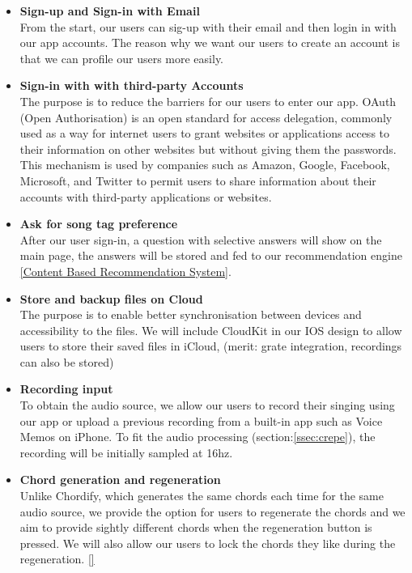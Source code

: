 \begin{itemize}

\item \textbf{Sign-up and Sign-in with Email}
\\From the start, our users can sig-up with their email and then login in with our app accounts. The reason why we want our users to create an account is that we can profile our users more easily.

\item \textbf{Sign-in with with third-party Accounts}
\\ The purpose is to reduce the barriers for our users to enter our app. OAuth (Open Authorisation) is an open standard for access delegation, commonly used as a way for internet users to grant websites or applications access to their information on other websites but without giving them the passwords. This mechanism is used by companies such as Amazon, Google, Facebook, Microsoft, and Twitter to permit users to share information about their accounts with third-party applications or websites.

\item \textbf{Ask for song tag preference}
\\After our user sign-in, a question with selective answers will show on the main page, the answers will be stored and fed to our recommendation engine \autoref{Content Based Recommendation System}.

\item \textbf{Store and backup files on Cloud}
\\The purpose is to enable better synchronisation between devices and accessibility to the files. 
We will include CloudKit in our IOS design to allow users to store their saved files in iCloud, (merit: grate integration, recordings can also be stored)

\item \textbf{Recording input}
\\ To obtain the audio source, we allow our users to record their singing using our app or upload a previous recording 
from a built-in app such as Voice Memos on iPhone. To fit the audio processing (section:\ref{ssec:crepe}), the recording will be initially sampled at 16hz.

\item \textbf{Chord generation and regeneration}
\\Unlike Chordify, which generates the same chords each time for the same audio source, we provide the option for users to regenerate the chords and we aim to provide sightly different chords when the regeneration button is pressed. 
We will also allow our users to lock the chords they like during the regeneration. \autoref{}


\end{itemize}
